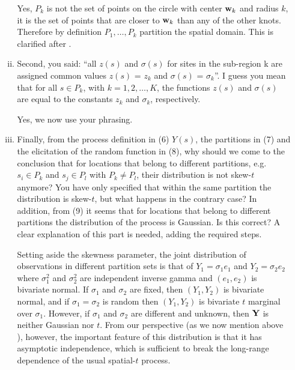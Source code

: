 \documentclass[11pt]{article}
\begin{document}
\begin{enumerate}[1.]
\begin{enumerate}[i.]
    \begin{response}
      Yes, $P_k$ is not the set of points on the circle with center $\mbox{\bf w}_k$ and radius $k$, it is the set of points that are closer to $\mbox{\bf w}_k$ than any of the other knots.
      Therefore by definition $P_1, \ldots, P_k$ partition the spatial domain.
      This is clarified after .
    \end{response}

    \item Second, you said: ``all $z(s)$ and $\sigma(s)$ for sites in the sub-region k are assigned common values $z(s)$ = $z_k$ and $\sigma(s)$ = $\sigma_k$''. I guess you mean that for all $s \in P_k$, with $k = 1, 2, \ldots, K$, the functions $z(s)$ and $\sigma(s)$ are equal to the constants $z_k$ and $\sigma_k$, respectively. \\

    \begin{response}
      Yes, we now use your phrasing.
    \end{response}

    \item Finally, from the process definition in (6) $Y(s)$, the partitions in (7) and the elicitation of the random function in (8), why should we come to the conclusion that for locations that belong to different partitions, e.g. $s_i \in P_k$ and $s_j \in P_l$ with $P_k \neq P_l$, their distribution is not skew-$t$ anymore? You have only specified that within the same partition the distribution is skew-$t$, but what happens in the contrary case? In addition, from (9) it seems that for locations that belong to different partitions the distribution of the process is Gaussian. Is this correct? A clear explanation of this part is needed, adding the required steps. \\

    \begin{response}
      Setting aside the skewness parameter, the joint distribution of observations in different partition sets is that of $Y_1 = \sigma_1 e_1$ and $Y_2 = \sigma_2 e_2$ where $\sigma_1^2$ and $\sigma_2^2$ are independent inverse gamma and $(e_1, e_2)$ is bivariate normal.
      If $\sigma_1$ and $\sigma_2$ are fixed, then $(Y_1, Y_2)$ is bivariate normal, and if $\sigma_1 = \sigma_2$ is random then $(Y_1, Y_2)$ is bivariate $t$ marginal over $\sigma_1$.
      However, if $\sigma_1$ and $\sigma_2$ are different and unknown, then $\mbox{\bf Y}$ is neither Gaussian nor $t$.
      From our perspective (as we now mention above ), however, the important feature of this distribution is that it has asymptotic independence, which is sufficient to break the long-range dependence of the usual spatial-$t$ process.
    \end{response}


\end{enumerate}
\end{enumerate}
\end{document}
